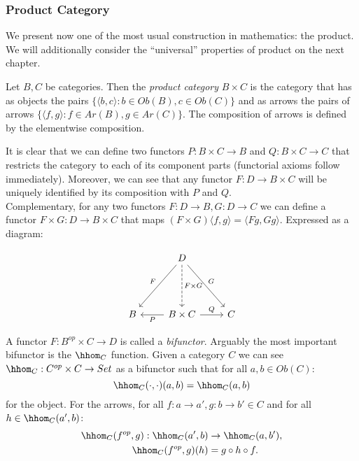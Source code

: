 \subsubsection{Product Category}
We present now one of the most usual construction in mathematics: the product. We will additionally consider the ``universal'' properties of product on the next chapter. 

\begin{definition}
  Let $B,C$ be categories. Then the \emph{product category} $B\times C$ is the category that has as objects the pairs $\{\langle b,c\rangle : b \in Ob(B), c\in Ob(C)\}$ and as arrows the pairs of arrows $\{\langle f,g\rangle: f \in Ar(B), g\in Ar(C)\}$. The composition of arrows is defined by the elementwise composition. 
\end{definition}

It is clear that we can define two functors $P: B\times C \to B$ and $Q: B \times C \to C$ that restricts the category to each of its component parts (functorial axioms follow immediately). Moreover, we can see that any functor $F:D\to B\times C$ will be uniquely identified by its composition with $P$ and $Q$.\\

Complementary, for any two functors $F:D\to B, G:D\to C$ we can define a functor $F \times G : D \to B\times C$ that maps $(F\times G) \langle f,g\rangle = \langle Fg, Gg\rangle$. Expressed as a diagram: 

\[
  \begin{tikzcd}
    {} & D
    \arrow[swap, "F"]{ddl}
    \arrow[dashed, "F\times G"]{dd}
    \arrow["G"]{ddr}\\
    {} & \\
    B & B \times C
    \arrow["P"]{l}
    \arrow["Q"]{r} & C
  \end{tikzcd}
\]

A functor $F: B^{op}\times C \to D$ is called  a \emph{bifunctor}. Arguably the most important bifunctor is the $\hhom_C$ function. Given a category $C$ we can see $\hhom_C: C^{op}\times C \to Set$ as a bifunctor such that for all $a,b \in Ob(C)$:
\[
  \hhom_C(\cdot,\cdot)(a,b) = \hhom_C (a,b) 
\]
for the object. For the arrows, for all $f:a\to a', g:b\to b' \in C$ and for all $h\in \hhom_C(a',b)$:
\begin{align*}
  \hhom_C(f^{op},g): \hhom_C (a',b)  & \to \hhom_C(a,b'), \\
  \hhom_C(f^{op},g) (h)   &= g \circ h \circ f.
\end{align*}

